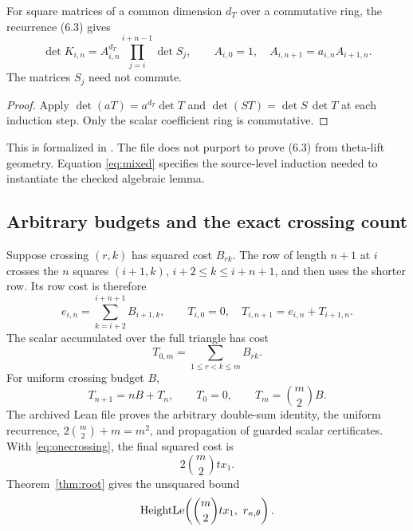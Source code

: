 \begin{proposition}
\label{prop:det}
For square matrices of a common dimension \(d_T\) over a commutative ring,
the recurrence (6.3) gives
\begin{equation}
 \det K_{i,n}
   =A_{i,n}^{d_T}\prod_{j=i}^{i+n-1}\det S_j,
 \qquad
 A_{i,0}=1,\quad A_{i,n+1}=a_{i,n}A_{i+1,n}.
\end{equation}
The matrices \(S_j\) need not commute.
\end{proposition}
\begin{proof}
Apply \(\det(aT)=a^{d_T}\det T\) and
\(\det(ST)=\det S\,\det T\) at each induction step.
Only the scalar coefficient ring is commutative.
\end{proof}

This is formalized in .
The file does not purport to prove (6.3) from theta-lift geometry.
Equation \eqref{eq:mixed} specifies the source-level induction needed to
instantiate the checked algebraic lemma.

\subsection{Arbitrary budgets and the exact crossing count}

Suppose crossing \((r,k)\) has squared cost \(B_{rk}\).
The row of length \(n+1\) at \(i\) crosses the \(n\) squares
\((i+1,k)\), \(i+2\le k\le i+n+1\), and then uses the shorter row.
Its row cost is therefore
\[
 e_{i,n}=\sum_{k=i+2}^{i+n+1}B_{i+1,k},\qquad
 T_{i,0}=0,\quad T_{i,n+1}=e_{i,n}+T_{i+1,n}.
\]
The scalar accumulated over the full triangle has cost
\begin{equation}
 T_{0,m}=\sum_{1\le r<k\le m}B_{rk}.
 \label{eq:weightedcost}
\end{equation}
For uniform crossing budget \(B\),
\[
 T_{n+1}=nB+T_n,\qquad T_0=0,\qquad
 T_m=\binom m2 B.
\]
The archived Lean file proves the arbitrary double-sum identity, the uniform
recurrence, \(2\binom m2+m=m^2\), and propagation of guarded scalar
certificates. With \eqref{eq:onecrossing}, the final squared cost is
\begin{equation}
 2\binom m2 tx_1.
\end{equation}
Theorem~\ref{thm:root} gives the unsquared bound
\begin{equation}
 \HLe\!\left(\binom m2 tx_1,\ r_{\kappa,\theta}\right).
\end{equation}


